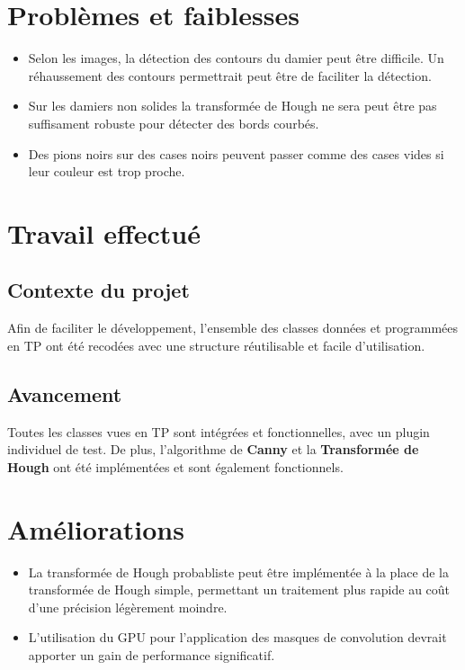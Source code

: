 \documentclass[a4paper, 12pt]{report}
\begin{document}
\section{Problèmes et faiblesses}

\begin{itemize}
\item Selon les images, la détection des contours du damier peut être difficile. Un réhaussement des contours permettrait peut être de faciliter la détection.
\item Sur les damiers non solides la transformée de Hough ne sera peut être pas suffisament robuste pour détecter des bords courbés.
\item Des pions noirs sur des cases noirs peuvent passer comme des cases vides si leur couleur est trop proche.
\end{itemize}

\section{Travail effectué}

\subsection*{Contexte du projet}

Afin de faciliter le développement, l'ensemble des classes données et programmées en TP ont été recodées avec une structure réutilisable et facile d'utilisation.

\subsection*{Avancement}

Toutes les classes vues en TP sont intégrées et fonctionnelles, avec un plugin individuel de test. De plus, l'algorithme de \textbf{Canny} et la \textbf{Transformée de Hough} ont été implémentées et sont également fonctionnels.

\section{Améliorations}

\begin{itemize}
\item La transformée de Hough probabliste peut être implémentée à la place de la transformée de Hough simple, permettant un traitement plus rapide au coût d'une précision légèrement moindre.
\item L'utilisation du GPU pour l'application des masques de convolution devrait apporter un gain de performance significatif.
\end{itemize}
\end{document}
